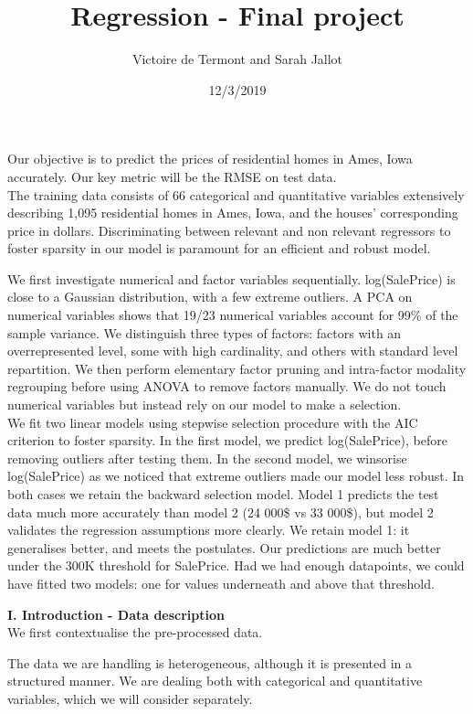 \documentclass[]{article}
\title{Regression - Final project}
\author{Victoire de Termont and Sarah Jallot}
\date{12/3/2019}
\begin{document}
\maketitle

Our objective is to predict the prices of residential homes in Ames,
Iowa accurately. Our key metric will be the RMSE on test data.\\
The training data consists of 66 categorical and quantitative variables
extensively describing 1,095 residential homes in Ames, Iowa, and the
houses' corresponding price in dollars. Discriminating between relevant
and non relevant regressors to foster sparsity in our model is paramount
for an efficient and robust model.

We first investigate numerical and factor variables sequentially.
log(SalePrice) is close to a Gaussian distribution, with a few extreme
outliers. A PCA on numerical variables shows that 19/23 numerical
variables account for 99\% of the sample variance. We distinguish three
types of factors: factors with an overrepresented level, some with high
cardinality, and others with standard level repartition. We then perform
elementary factor pruning and intra-factor modality regrouping before
using ANOVA to remove factors manually. We do not touch numerical
variables but instead rely on our model to make a selection.\\
We fit two linear models using stepwise selection procedure with the AIC
criterion to foster sparsity. In the first model, we predict
log(SalePrice), before removing outliers after testing them. In the
second model, we winsorise log(SalePrice) as we noticed that extreme
outliers made our model less robust. In both cases we retain the
backward selection model. Model 1 predicts the test data much more
accurately than model 2 (24 000\$ vs 33 000\$), but model 2 validates
the regression assumptions more clearly. We retain model 1: it
generalises better, and meets the postulates. Our predictions are much
better under the 300K threshold for SalePrice. Had we had enough
datapoints, we could have fitted two models: one for values underneath
and above that threshold.

\textbf{I. Introduction - Data description}\\
We first contextualise the pre-processed data.

The data we are handling is heterogeneous, although it is presented in a
structured manner. We are dealing both with categorical and quantitative
variables, which we will consider separately.
\end{document}
